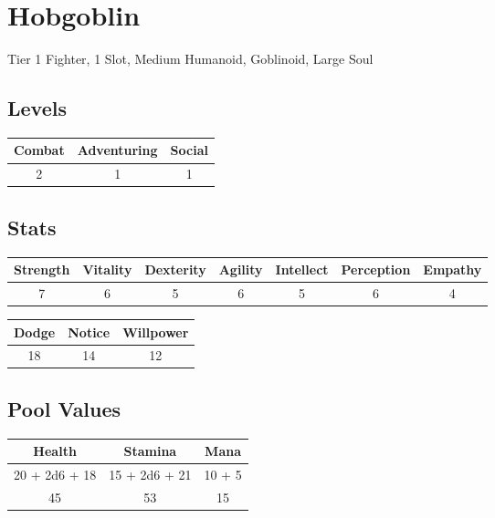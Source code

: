 \section{Hobgoblin}
Tier 1 Fighter, 1 Slot, Medium Humanoid, Goblinoid, Large Soul\\

\subsection{Levels}
\begin{minipage}[H]{1\textwidth}
	\centering
	\begin{tabular}[c]{|c | c | c|}
		\hline
		Combat & Adventuring & Social\\
		\hline
		2 & 1 & 1\\
		\hline
	\end{tabular}
\end{minipage}

\subsection{Stats}
\begin{minipage}[H]{1\textwidth}
	\centering
	\begin{tabular}[c]{|c | c | c | c | c | c | c|}
		\hline
		Strength & Vitality & Dexterity & Agility & Intellect & Perception & Empathy\\
		\hline
		7 & 6 & 5 & 6 & 5 & 6 & 4\\
		\hline
	\end{tabular}
\end{minipage}
\bigbreak

\begin{minipage}[H]{1\textwidth}
	\centering
	\begin{tabular}[c]{|c | c | c|}
		\hline
		Dodge & Notice & Willpower\\
		\hline
		18 & 14 & 12\\
		\hline
	\end{tabular}
\end{minipage}

\subsection{Pool Values}
\bigbreak
\begin{minipage}[H]{1\textwidth}
	\centering
	\begin{tabular}[c]{|c | c | c|}
		\hline
		Health & Stamina & Mana\\
		\hline
		20 + 2d6 + 18 & 15 + 2d6 + 21 & 10 + 5 \\
		45 & 53 & 15\\
		\hline
	\end{tabular}
\end{minipage}
\noindent

